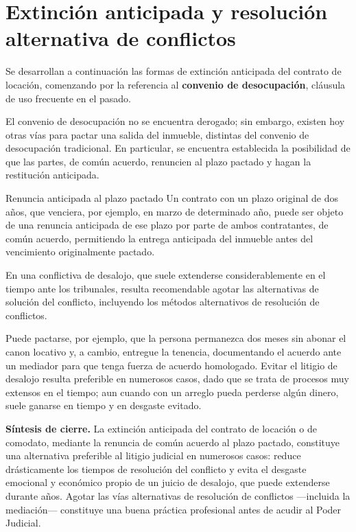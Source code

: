 \documentclass[12pt,oneside]{book}
\begin{document}
\section{Extinción anticipada y resolución alternativa de conflictos}

Se desarrollan a continuación las formas de extinción anticipada del contrato de locación, comenzando por la referencia al \textbf{convenio de desocupación}, cláusula de uso frecuente en el pasado.

\begin{note}
El convenio de desocupación no se encuentra derogado; sin embargo, existen hoy otras vías para pactar una salida del inmueble, distintas del convenio de desocupación tradicional. En particular, se encuentra establecida la posibilidad de que las partes, de común acuerdo, renuncien al plazo pactado y hagan la restitución anticipada.
\end{note}

\begin{example}{Renuncia anticipada al plazo pactado}
Un contrato con un plazo original de dos años, que venciera, por ejemplo, en marzo de determinado año, puede ser objeto de una renuncia anticipada de ese plazo por parte de ambos contratantes, de común acuerdo, permitiendo la entrega anticipada del inmueble antes del vencimiento originalmente pactado.
\end{example}

En una conflictiva de desalojo, que suele extenderse considerablemente en el tiempo ante los tribunales, resulta recomendable agotar las alternativas de solución del conflicto, incluyendo los métodos alternativos de resolución de conflictos.

\begin{important}
Puede pactarse, por ejemplo, que la persona permanezca dos meses sin abonar el canon locativo y, a cambio, entregue la tenencia, documentando el acuerdo ante un mediador para que tenga fuerza de acuerdo homologado. Evitar el litigio de desalojo resulta preferible en numerosos casos, dado que se trata de procesos muy extensos en el tiempo; aun cuando con un arreglo pueda perderse algún dinero, suele ganarse en tiempo y en desgaste evitado.
\end{important}

\begin{important}
\textbf{Síntesis de cierre.} La extinción anticipada del contrato de locación o de comodato, mediante la renuncia de común acuerdo al plazo pactado, constituye una alternativa preferible al litigio judicial en numerosos casos: reduce drásticamente los tiempos de resolución del conflicto y evita el desgaste emocional y económico propio de un juicio de desalojo, que puede extenderse durante años. Agotar las vías alternativas de resolución de conflictos ---incluida la mediación--- constituye una buena práctica profesional antes de acudir al Poder Judicial.
\end{important}
\end{document}

